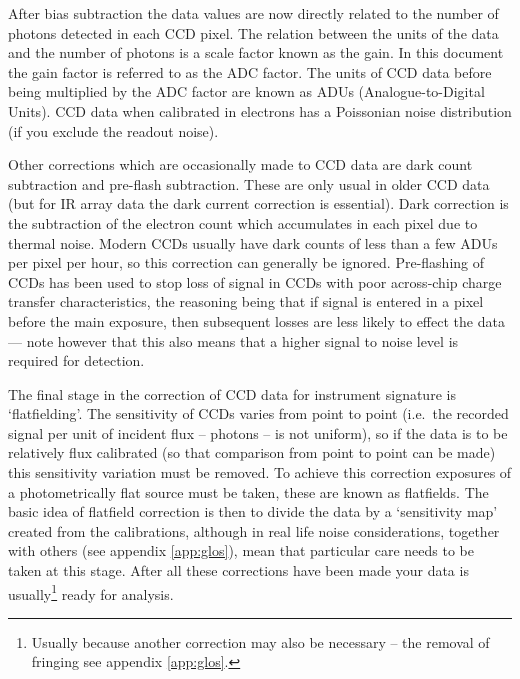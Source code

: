 \documentclass[twoside,11pt]{article}
\renewcommand{\_}{\texttt{\symbol{95}}}
\begin{document}
After bias subtraction the data values are now directly related to the
number of photons detected in each CCD pixel.
The relation between the units of the data and the number of photons
is a scale factor known as the gain.
In this document the gain factor is referred to as the ADC factor.
The units of CCD data before being multiplied by the ADC factor are
known as ADUs (Analogue-to-Digital Units).
CCD data when calibrated in electrons has a Poissonian noise distribution
(if you exclude the readout noise).

Other corrections which are occasionally made to CCD data are
dark count subtraction and pre-flash subtraction.
These are only usual in older CCD data (but for IR array data the dark
current correction is essential).
Dark correction is the subtraction of the electron count which
accumulates in each pixel due to thermal noise.
Modern CCDs usually have dark counts of less than a few ADUs per pixel
per hour, so this correction can generally be ignored.
Pre-flashing of CCDs has been used to stop loss of signal in CCDs with
poor across-chip charge transfer characteristics, the reasoning being
that if signal is entered in a pixel before the main exposure, then
subsequent losses are less likely to effect the data --- note however
that this also means that a higher signal to noise level is required
for detection.

The final stage in the correction of CCD data for instrument signature
is `flatfielding'.
The sensitivity of CCDs varies from point to point (i.e.\ the recorded
signal per unit of incident flux -- photons -- is not uniform), so if
the data is to be relatively flux calibrated (so that comparison from
point to point can be made) this sensitivity variation must be
removed.
To achieve this correction exposures of a photometrically flat source
must be taken, these are known as flatfields.
The basic idea of flatfield correction is then to divide the data by a
`sensitivity map' created from the calibrations, although in real life
noise considerations, together with others (see appendix \ref{app:glos}),
mean that particular care needs to be taken at this stage.
After all these corrections have been made your data is
usually\footnote{Usually because another correction may also be
necessary -- the removal of fringing see appendix \ref{app:glos}.}
ready for analysis.
\end{document}
